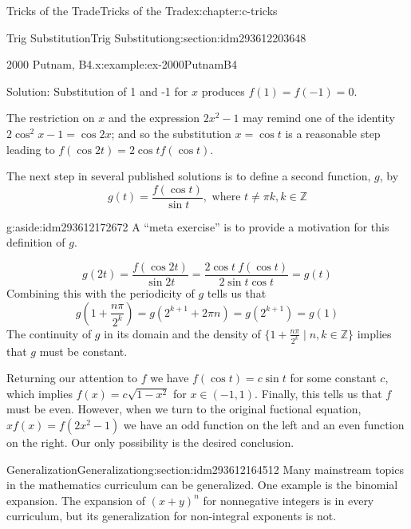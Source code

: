 \documentclass[twoside,10pt,]{book}
\numberwithin{equation}{section}
\begin{document}
\begin{chapterptx}{Tricks of the Trade}{}{Tricks of the Trade}{}{}{x:chapter:c-tricks}
\begin{sectionptx}{Trig Substitution}{}{Trig Substitution}{}{}{g:section:idm293612203648}
\begin{example}{2000 Putnam, B4.}{x:example:ex-2000PutnamB4}
\par
Solution: Substitution of 1 and -1 for \(x\) produces \(f(1)=f(-1)=0\).%
\par
The restriction on \(x\) and the expression \(2 x^2 -1\) may remind one of the identity \(2\cos^2{x} - 1 = \cos{2 x}\); and so the substitution \(x = \cos{t}\) is a reasonable step leading to \(f(\cos{2t})=2 \cos{t} f(\cos{t})\).%
\par
The next step in several published solutions is to define a second function, \(g\), by%
\begin{equation*}
g(t)=\frac{f(\cos{t})}{\sin{t}}, \textrm{ where } t\neq \pi k, k\in \mathbb{Z}
\end{equation*}
%
\begin{aside}{}{g:aside:idm293612172672}%
A ``meta exercise'' is to provide a motivation for this definition of \(g\).%
\end{aside}
%
\begin{equation*}
g(2t)=\frac{f(\cos{2t})}{\sin{2t}}=\frac{2 \cos{t}\: f(\cos{t})}{2\sin{t}\cos{t}}=g(t)
\end{equation*}
Combining this with the periodicity of \(g\) tells us that%
\begin{equation*}
g(1+\frac{n \pi}{2^k})=g(2^{k+1}+2 \pi n) = g(2^{k+1})=g(1)
\end{equation*}
The continuity of \(g\) in its domain and the density of \(\{1+\frac{n \pi}{2^k} \mid n,k \in \mathbb{Z}\}\) implies that \(g\) must be constant.%
\par
Returning our attention to \(f\) we have \(f(\cos{t})= c \sin{t}\) for some constant \(c\), which implies \(f(x) = c \sqrt{1-x^2}\) for \(x \in (-1,1)\).  Finally, this tells us that \(f\) must be even.  However, when we turn to the original fuctional equation, \(x f(x)=f(2x^2-1)\) we have an odd function on the left and an even function on the right.  Our only possibility is the desired conclusion.%
\end{example}
\end{sectionptx}
%
%
\typeout{************************************************}
\typeout{************************************************}
%
\begin{sectionptx}{Generalization}{}{Generalization}{}{}{g:section:idm293612164512}
Many mainstream topics in the mathematics curriculum can be generalized. One example is the binomial expansion.  The expansion of \((x+y)^n\) for nonnegative integers is in every curriculum, but its generalization for non-integral exponents is not.%

\end{sectionptx}
\end{chapterptx}
\end{document}
